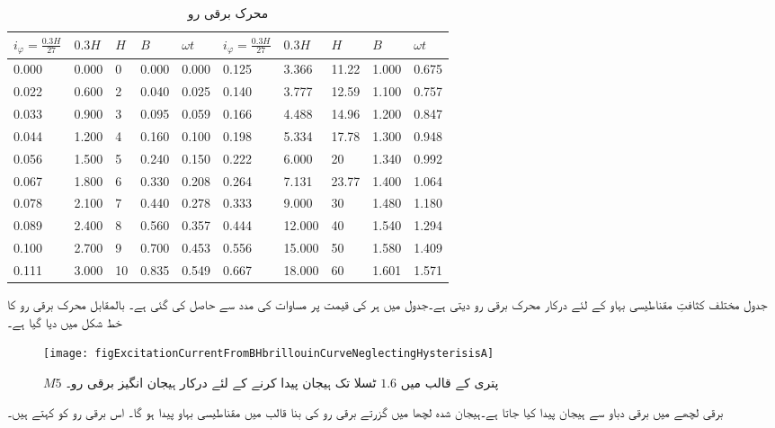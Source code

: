 %
\begin{table}
\begin{tabular}{l l l l l | l l l l l}
$i_{\varphi}=\frac{0.3 H}{27}$&$0.3H$&$H$&$B$&$\omega t$&$i_{\varphi}=\frac{0.3 H}{27}$&$0.3H$&$H$&$B$&$\omega t$\\
\midrule
0.000&0.000&0&0.000&0.000&0.125&3.366&11.22&1.000&0.675\\
0.022&0.600&2&0.040&0.025&0.140&3.777&12.59&1.100&0.757\\
0.033&0.900&3&0.095&0.059&0.166&4.488&14.96&1.200&0.847\\
0.044&1.200&4&0.160&0.100&0.198&5.334&17.78&1.300&0.948\\
0.056&1.500&5&0.240&0.150&0.222&6.000&20&1.340&0.992\\
0.067&1.800&6&0.330&0.208&0.264&7.131&23.77&1.400&1.064\\
0.078&2.100&7&0.440&0.278&0.333&9.000&30&1.480&1.180\\
0.089&2.400&8&0.560&0.357&0.444&12.000&40&1.540&1.294\\
0.100&2.700&9&0.700&0.453&0.556&15.000&50&1.580&1.409\\
0.111&3.000&10&0.835&0.549&0.667&18.000&60&1.601&1.571\\
\bottomrule
\end{tabular}
\caption{محرک برقی رو}
\label{جدول_مقناطیسی_ادوار_محرک_برقی_رو_بالمقابل_کثافت_بہاو}
\end{table}

جدول   مختلف کثافتِ مقناطیسی بہاو کے لئے درکار محرک برقی رو دیتی ہے۔جدول میں  ہر  کی قیمت پر   مساوات   کی مدد سے حاصل کی گئی ہے۔ بالمقابل محرک برقی رو کا خط شکل  میں دیا گیا ہے۔
%
\begin{figure}
\centering
\texttt{[image: figExcitationCurrentFromBHbrillouinCurveNeglectingHysterisisA]}
\caption{$M5$ پتری کے قالب میں $1.6$ ٹسلا تک ہیجان پیدا کرنے کے لئے درکار ہیجان انگیز برقی رو۔}
\label{شکل_مقناطیسی_ادوار_ہیجان_رو_چال_نظرانداز}
\end{figure}

برقی لچھے میں برقی دباو سے ہیجان پیدا کیا جاتا ہے۔ہیجان شدہ لچھا میں گزرتے برقی رو  کی بنا  قالب میں مقناطیسی بہاو پیدا ہو گا۔ اس برقی رو  کو   کہتے ہیں۔

